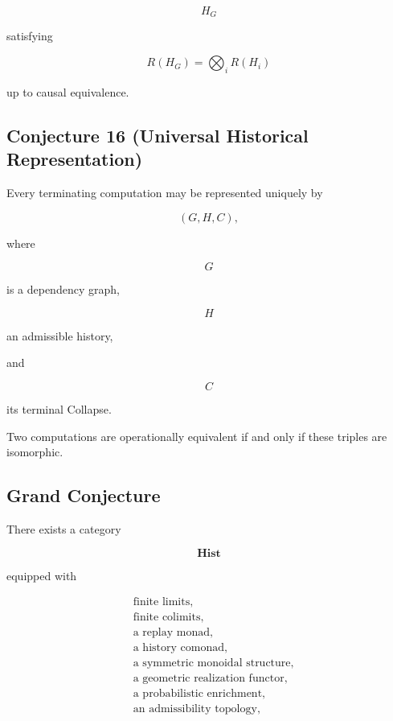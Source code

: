 \documentclass[12pt,oneside]{article}
\theoremstyle{definition}
\theoremstyle{remark}
\begin{document}
\[
H_G
\]

satisfying

\[
R(H_G)
=
\bigotimes_i
R(H_i)
\]

up to causal equivalence.

\subsection*{Conjecture 16 (Universal Historical Representation)}

Every terminating computation may be represented uniquely by

\[
(G,H,C),
\]

where

\[
G
\]

is a dependency graph,

\[
H
\]

an admissible history,

and

\[
C
\]

its terminal Collapse.

Two computations are operationally equivalent if and only if these triples are
isomorphic.

\subsection*{Grand Conjecture}

There exists a category

\[
\mathbf{Hist}
\]

equipped with

\[
\begin{aligned}
&
\text{finite limits},\\
&
\text{finite colimits},\\
&
\text{a replay monad},\\
&
\text{a history comonad},\\
&
\text{a symmetric monoidal structure},\\
&
\text{a geometric realization functor},\\
&
\text{a probabilistic enrichment},\\
&
\text{an admissibility topology},
\end{aligned}
\]
\end{document}
